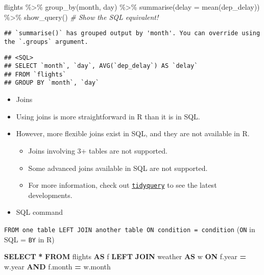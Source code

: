 \documentclass[
]{book}
\newenvironment{Shaded}{\begin{snugshade}}{\end{snugshade}}
\newcommand{\AttributeTok}[1]{\textcolor[rgb]{0.77,0.63,0.00}{#1}}
\newcommand{\CommentTok}[1]{\textcolor[rgb]{0.56,0.35,0.01}{\textit{#1}}}
\newcommand{\DataTypeTok}[1]{\textcolor[rgb]{0.13,0.29,0.53}{#1}}
\newcommand{\FunctionTok}[1]{\textcolor[rgb]{0.00,0.00,0.00}{#1}}
\newcommand{\KeywordTok}[1]{\textcolor[rgb]{0.13,0.29,0.53}{\textbf{#1}}}
\newcommand{\NormalTok}[1]{#1}
\newcommand{\OperatorTok}[1]{\textcolor[rgb]{0.81,0.36,0.00}{\textbf{#1}}}
\newcommand{\SpecialCharTok}[1]{\textcolor[rgb]{0.00,0.00,0.00}{#1}}
\providecommand{\tightlist}{%
  \setlength{\itemsep}{0pt}\setlength{\parskip}{0pt}}
\begin{document}
\begin{Shaded}
\begin{Highlighting}[]
\NormalTok{flights }\SpecialCharTok{\%\textgreater{}\%}
  \FunctionTok{group\_by}\NormalTok{(month, day) }\SpecialCharTok{\%\textgreater{}\%}
  \FunctionTok{summarise}\NormalTok{(}\AttributeTok{delay =} \FunctionTok{mean}\NormalTok{(dep\_delay)) }\SpecialCharTok{\%\textgreater{}\%}
  \FunctionTok{show\_query}\NormalTok{() }\CommentTok{\# Show the SQL equivalent!}
\end{Highlighting}
\end{Shaded}

\begin{verbatim}
## `summarise()` has grouped output by 'month'. You can override using the `.groups` argument.
\end{verbatim}

\begin{verbatim}
## <SQL>
## SELECT `month`, `day`, AVG(`dep_delay`) AS `delay`
## FROM `flights`
## GROUP BY `month`, `day`
\end{verbatim}

\begin{itemize}
\item
  Joins
\item
  Using joins is more straightforward in R than it is in SQL.
\item
  However, more flexible joins exist in SQL, and they are not available in R.

  \begin{itemize}
  \tightlist
  \item
    Joins involving 3+ tables are not supported.
  \item
    Some advanced joins available in SQL are not supported.
  \item
    For more information, check out \href{https://github.com/ianmcook/tidyquery/issues}{\texttt{tidyquery}} to see the latest developments.
  \end{itemize}
\item
  SQL command
\end{itemize}

\texttt{FROM\ one\ table\ LEFT\ JOIN\ another\ table\ ON\ condition\ =\ condition} (\texttt{ON} in SQL = \texttt{BY} in R)

\begin{Shaded}
\begin{Highlighting}[]
\KeywordTok{SELECT} \OperatorTok{*}
\KeywordTok{FROM}\NormalTok{ flights }\KeywordTok{AS}\NormalTok{ f}
\KeywordTok{LEFT} \KeywordTok{JOIN}\NormalTok{ weather }\KeywordTok{AS}\NormalTok{ w }
\KeywordTok{ON}\NormalTok{ f.}\DataTypeTok{year} \OperatorTok{=}\NormalTok{ w.}\DataTypeTok{year} \KeywordTok{AND}\NormalTok{ f.}\DataTypeTok{month} \OperatorTok{=}\NormalTok{ w.}\DataTypeTok{month}
\end{Highlighting}
\end{Shaded}
\end{document}
